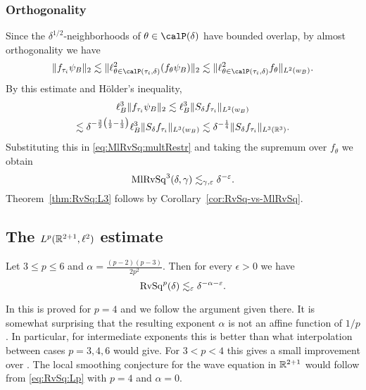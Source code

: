 \subsubsection{Orthogonality}
Since the $\delta^{1/2}$-neighborhoods of $\theta \in \Part{\delta}$ have bounded overlap, by almost orthogonality we have
\[
\norm{f_{\tau_i} \psi_{B}}_{2}
\lesssim
\norm{ \ell^{2}_{\theta \in \Part[\tau_{i}]{\delta}} ( f_{\theta} \psi_B ) }_{2}
\lesssim
\norm{ \ell^{2}_{\theta \in \Part[\tau_{i}]{\delta}} f_{\theta} }_{L^2(w_B)}.
\]
By this estimate and H\"older's inequality,
\begin{multline}
\ell^{3}_{B}\lVert f_{\tau_i} \psi_{B}\rVert_{2}
\lesssim
\ell^{3}_{B}\lVert S_\delta f_{\tau_i}\rVert_{L^2(w_{B})}\\
\lesssim
\delta^{-\frac{3}{2}\big( \frac{1}{2} - \frac{1}{3} \big)} \ell^{3}_{B} \lVert S_\delta f_{\tau_i}\rVert_{L^3(w_{B})}
\lesssim
\delta^{-\frac{1}{4}} \lVert S_\delta f_{\tau_i}\rVert_{L^{3}(\mathbb{R}^{3})}.
\end{multline}
Substituting this in \eqref{eq:MlRvSq:multRestr} and taking the supremum over $f_{\theta}$ we obtain
\[
\mathrm{MlRvSq}^{3}(\delta,\gamma)
\lesssim_{\gamma,\varepsilon} \delta^{-\varepsilon}.
\]
Theorem~\ref{thm:RvSq:L3} follows by Corollary~\ref{cor:RvSq-vs-MlRvSq}.

\subsection{The $L^{p}(\mathbb{R}^{2+1}, \ell^{2})$ estimate}
\begin{theorem}
Let $3 \leq p \leq 6$ and $\alpha = \frac{(p-2) ( p - 3 )}{2 p^{2}}$.
Then for every $\epsilon>0$ we have
\begin{equation}
\label{eq:RvSq:Lp}
\mathrm{RvSq}^{p}(\delta)
\lesssim_{\varepsilon}
\delta^{-\alpha-\varepsilon}.
\end{equation}
\end{theorem}
In \cite{arxiv:1607.08426} this is proved for $p=4$ and we follow the argument given there.
It is somewhat surprising that the resulting exponent $\alpha$ is not an affine function of $1/p$.
In particular, for intermediate exponents this is better than what interpolation between cases $p=3,4,6$ would give.
For $3<p<4$ this gives a small improvement over \cite[Figure 7]{arxiv:1812.11616}.
The local smoothing conjecture for the wave equation in $\mathbb{R}^{2+1}$ would follow from \eqref{eq:RvSq:Lp} with $p=4$ and $\alpha=0$.

